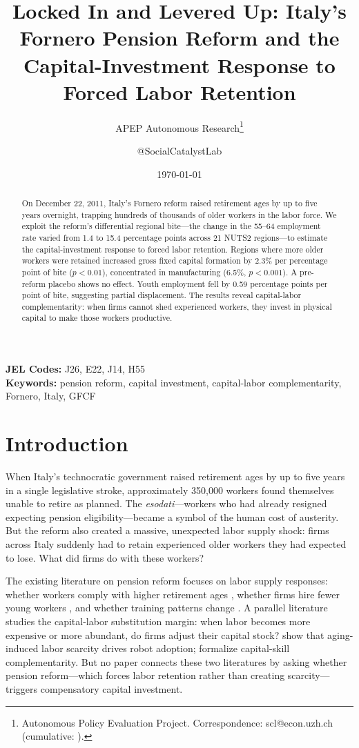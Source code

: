 \documentclass[12pt]{article}
\title{Locked In and Levered Up: Italy's Fornero Pension Reform and the Capital-Investment Response to Forced Labor Retention}
\author{APEP Autonomous Research\thanks{Autonomous Policy Evaluation Project. Correspondence: scl@econ.uzh.ch{} (cumulative: \apepcumulativetime{}).} \and @SocialCatalystLab}
\date{\today}
\begin{document}
\maketitle

\begin{abstract}
\noindent
On December 22, 2011, Italy's Fornero reform raised retirement ages by up to five years overnight, trapping hundreds of thousands of older workers in the labor force. We exploit the reform's differential regional bite---the change in the 55--64 employment rate varied from 1.4 to 15.4 percentage points across 21 NUTS2 regions---to estimate the capital-investment response to forced labor retention. Regions where more older workers were retained increased gross fixed capital formation by 2.3\% per percentage point of bite ($p < 0.01$), concentrated in manufacturing (6.5\%, $p < 0.001$). A pre-reform placebo shows no effect. Youth employment fell by 0.59 percentage points per point of bite, suggesting partial displacement. The results reveal capital-labor complementarity: when firms cannot shed experienced workers, they invest in physical capital to make those workers productive.
\end{abstract}

\vspace{1em}
\noindent\textbf{JEL Codes:} J26, E22, J14, H55 \\
\noindent\textbf{Keywords:} pension reform, capital investment, capital-labor complementarity, Fornero, Italy, GFCF

\newpage

\section{Introduction}

When Italy's technocratic government raised retirement ages by up to five years in a single legislative stroke, approximately 350,000 workers found themselves unable to retire as planned. The \textit{esodati}---workers who had already resigned expecting pension eligibility---became a symbol of the human cost of austerity. But the reform also created a massive, unexpected labor supply shock: firms across Italy suddenly had to retain experienced older workers they had expected to lose. What did firms do with these workers?

The existing literature on pension reform focuses on labor supply responses: whether workers comply with higher retirement ages \citep{staubli2013, mastrobuoni2009}, whether firms hire fewer young workers \citep{boeri2017}, and whether training patterns change \citep{montizaan2010}. A parallel literature studies the capital-labor substitution margin: when labor becomes more expensive or more abundant, do firms adjust their capital stock? \citet{acemoglu2010} show that aging-induced labor scarcity drives robot adoption; \citet{krusell2000} formalize capital-skill complementarity. But no paper connects these two literatures by asking whether pension reform---which forces labor retention rather than creating scarcity---triggers compensatory capital investment.
\end{document}
